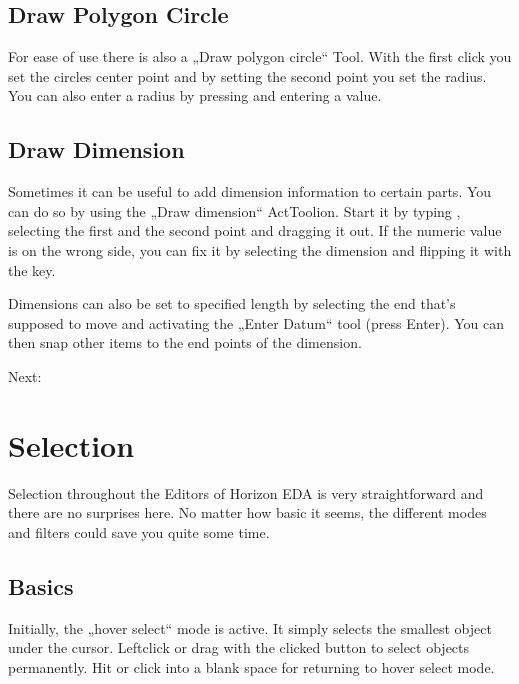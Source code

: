 \documentclass[letterpaper,10pt,czech]{sphinxmanual}
\begin{document}
\section{Draw Polygon Circle}
\label{\detokenize{drawing:draw-polygon-circle}}


For ease of use there is also a „Draw polygon circle“ Tool. With the first click you set the circles center point and by setting the second point you set the radius. You can also enter a radius by pressing  and entering a value.


\section{Draw Dimension}
\label{\detokenize{drawing:draw-dimension}}


Sometimes it can be useful to add dimension information to certain parts. You can do so by using the „Draw dimension“ ActToolion. Start it by typing , selecting the first and the second point and dragging it out. If the numeric value is on the wrong side, you can fix it by selecting the dimension and flipping it with the  key.

Dimensions can also be set to specified length by selecting the end that’s supposed to move and activating the „Enter Datum“ tool (press Enter). You can then snap other items to the end points of the dimension.

Next: {\hyperref[\detokenize{selection::doc}]{}}


\chapter{Selection}
\label{\detokenize{selection:selection}}\label{\detokenize{selection::doc}}
Selection throughout the Editors of Horizon EDA is very straightforward and there are no surprises here. No matter how basic it seems, the different modes and filters could save you quite some time.


\section{Basics}
\label{\detokenize{selection:basics}}
\noindent{}

Initially, the „hover select“ mode is active. It simply selects the
smallest object under the cursor. Leftclick or drag with the clicked button to select objects permanently. Hit  or click into a blank space for returning to hover select mode.
\end{document}
